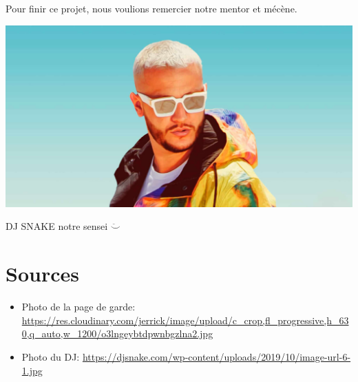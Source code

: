 \documentclass[11pt,a4paper]{article}
\begin{document}
	Pour finir ce projet, nous voulions remercier notre mentor et mécène.  
	\begin{center}
	 \includegraphics[scale= 0.25]{./images/DJSNAKE.jpg}  
	 \caption{DJ SNAKE notre sensei $\ddot\smile$}
    \end{center}


\section*{Sources} %
    \begin{itemize}
        \item Photo de la page de garde: \url{https://res.cloudinary.com/jerrick/image/upload/c_crop,fl_progressive,h_630,q_auto,w_1200/o3lngeybtdpwnbgzlna2.jpg}
        \item Photo du DJ: \url{https://djsnake.com/wp-content/uploads/2019/10/image-url-6-1.jpg}
    \end{itemize}
\end{document}
